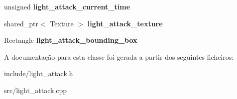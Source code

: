\begin{DoxyCompactItemize}
\mbox{\label{classLightAttack_aee4f749c8ca775a69cd4131c19161f02}} 
unsigned {\bfseries light\+\_\+attack\+\_\+current\+\_\+time}
\item 
\mbox{\label{classLightAttack_a065d9f14c32d8ff696a1d7cc3cff7827}} 
shared\+\_\+ptr$<$ Texture $>$ {\bfseries light\+\_\+attack\+\_\+texture}
\item 
\mbox{\label{classLightAttack_af975ca361098b021dff4668dc3b3da68}} 
Rectangle {\bfseries light\+\_\+attack\+\_\+bounding\+\_\+box}
\end{DoxyCompactItemize}


A documentação para esta classe foi gerada a partir dos seguintes ficheiros\+:\begin{DoxyCompactItemize}
\item 
include/light\+\_\+attack.\+h\item 
src/light\+\_\+attack.\+cpp\end{DoxyCompactItemize}
